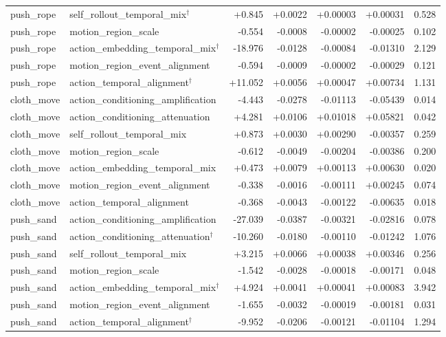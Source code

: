 \begin{table}[t]
\begin{tabular}{llrrrrr}
push\_rope & self\_rollout\_temporal\_mix$^\dagger$ & +0.845 & +0.0022 & +0.00003 & +0.00031 & 0.528 \\
push\_rope & motion\_region\_scale & -0.554 & -0.0008 & -0.00002 & -0.00025 & 0.102 \\
push\_rope & action\_embedding\_temporal\_mix$^\dagger$ & -18.976 & -0.0128 & -0.00084 & -0.01310 & 2.129 \\
push\_rope & motion\_region\_event\_alignment & -0.594 & -0.0009 & -0.00002 & -0.00029 & 0.121 \\
push\_rope & action\_temporal\_alignment$^\dagger$ & +11.052 & +0.0056 & +0.00047 & +0.00734 & 1.131 \\
cloth\_move & action\_conditioning\_amplification & -4.443 & -0.0278 & -0.01113 & -0.05439 & 0.014 \\
cloth\_move & action\_conditioning\_attenuation & +4.281 & +0.0106 & +0.01018 & +0.05821 & 0.042 \\
cloth\_move & self\_rollout\_temporal\_mix & +0.873 & +0.0030 & +0.00290 & -0.00357 & 0.259 \\
cloth\_move & motion\_region\_scale & -0.612 & -0.0049 & -0.00204 & -0.00386 & 0.200 \\
cloth\_move & action\_embedding\_temporal\_mix & +0.473 & +0.0079 & +0.00113 & +0.00630 & 0.020 \\
cloth\_move & motion\_region\_event\_alignment & -0.338 & -0.0016 & -0.00111 & +0.00245 & 0.074 \\
cloth\_move & action\_temporal\_alignment & -0.368 & -0.0043 & -0.00122 & -0.00635 & 0.018 \\
push\_sand & action\_conditioning\_amplification & -27.039 & -0.0387 & -0.00321 & -0.02816 & 0.078 \\
push\_sand & action\_conditioning\_attenuation$^\dagger$ & -10.260 & -0.0180 & -0.00110 & -0.01242 & 1.076 \\
push\_sand & self\_rollout\_temporal\_mix & +3.215 & +0.0066 & +0.00038 & +0.00346 & 0.256 \\
push\_sand & motion\_region\_scale & -1.542 & -0.0028 & -0.00018 & -0.00171 & 0.048 \\
push\_sand & action\_embedding\_temporal\_mix$^\dagger$ & +4.924 & +0.0041 & +0.00041 & +0.00083 & 3.942 \\
push\_sand & motion\_region\_event\_alignment & -1.655 & -0.0032 & -0.00019 & -0.00181 & 0.031 \\
push\_sand & action\_temporal\_alignment$^\dagger$ & -9.952 & -0.0206 & -0.00121 & -0.01104 & 1.294 \\

\end{tabular}
\end{table}
